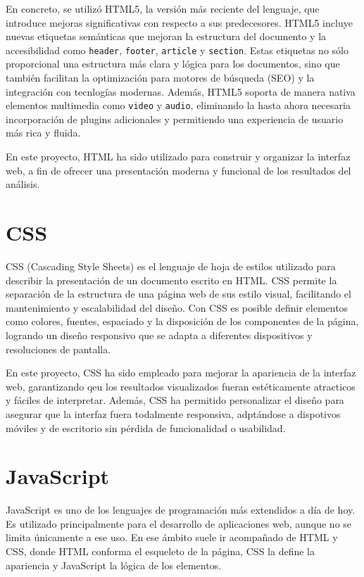 \documentclass[a4paper, 12pt]{book}
\begin{document}
En concreto, se utilizó HTML5, la versión más reciente del lenguaje, que introduce mejoras significativas con respecto a sus predecesores. HTML5 incluye nuevas etiquetas semánticas que mejoran la estructura del documento y la accesibilidad como \texttt{header}, \texttt{footer}, \texttt{article} y \texttt{section}. Estas etiquetas no sólo proporcional una estructura más clara y lógica para los documentos, sino que también facilitan la optimización para motores de búsqueda (SEO) y la integración con tecnlogías modernas. Además, HTML5 soporta de manera nativa elementos multimedia como \texttt{video} y \texttt{audio}, eliminando la hasta ahora necesaria incorporación de plugins adicionales y permitiendo una experiencia de usuario más rica y fluida.

En este proyecto, HTML ha sido utilizado para construir y organizar la interfaz web, a fin de ofrecer una presentación moderna y funcional de los resultados del análisis.

\section{CSS}
CSS (Cascading Style Sheets) es el lenguaje de hoja de estilos utilizado para describir la presentación de un documento escrito en HTML. CSS permite la separación de la estructura de una página web de sus estilo visual, facilitando el mantenimiento y escalabilidad del diseño. Con CSS es posible definir elementos como colores, fuentes, espaciado y la disposición de los componentes de la página, logrando un diseño responsivo que se adapta a diferentes dispositivos y resoluciones de pantalla.

En este proyecto, CSS ha sido empleado para mejorar la apariencia de la interfaz web, garantizando qeu los resultados visualizados fueran estéticamente atracticos y fáciles de interpretar. Además, CSS ha permitido personalizar el diseño para asegurar que la interfaz fuera todalmente responsiva, adptándose a dispotivos móviles y de escritorio sin pérdida de funcionalidad o usabilidad.

\section{JavaScript}
JavaScript \cite{haverbeke_eloquentjs} es uno de los lenguajes de programación más extendidos a día de hoy. Es utilizado principalmente para el desarrollo de aplicaciones web, aunque no se limita únicamente a ese uso. En ese ámbito suele ir acompañado de HTML y CSS, donde HTML conforma el esqueleto de la página, CSS la define la apariencia y JavaScript la lógica de los elementos. 
\end{document}
